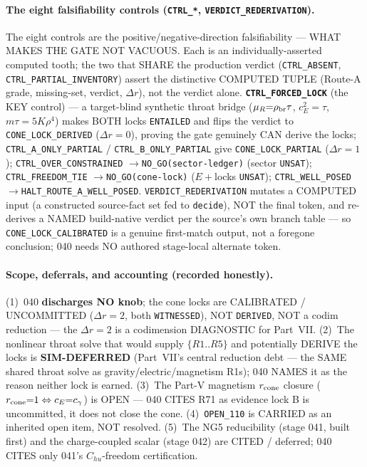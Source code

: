 \paragraph{The eight falsifiability controls (\texttt{CTRL\_*}, \texttt{VERDICT\_REDERIVATION}).}
The eight controls are the positive/negative-direction falsifiability --- WHAT
MAKES THE GATE NOT VACUOUS. Each is an individually-asserted computed tooth; the
two that SHARE the production verdict (\texttt{CTRL\_ABSENT},
\texttt{CTRL\_PARTIAL\_INVENTORY}) assert the distinctive COMPUTED TUPLE
(Route-A grade, missing-set, verdict, \(\Delta r\)), not the verdict alone.
\textbf{\texttt{CTRL\_FORCED\_LOCK}} (the KEY control) --- a target-blind synthetic
throat bridge (\(\mu_R{=}\rho_{\rm br}\tau\), \(c_E^2{=}\tau\),
\(m\tau{=}5K\rho^4\)) makes BOTH locks \texttt{ENTAILED} and flips the verdict to
\texttt{CONE\_LOCK\_DERIVED} (\(\Delta r{=}0\)), proving the gate genuinely CAN
derive the locks; \texttt{CTRL\_A\_ONLY\_PARTIAL} /
\texttt{CTRL\_B\_ONLY\_PARTIAL} give \texttt{CONE\_LOCK\_PARTIAL} (\(\Delta r{=}1\));
\texttt{CTRL\_OVER\_CONSTRAINED} \(\to\)\texttt{NO\_GO(sector-ledger)} (sector
\texttt{UNSAT}); \texttt{CTRL\_FREEDOM\_TIE} \(\to\)\texttt{NO\_GO(cone-lock)}
(\(E{+}\)locks \texttt{UNSAT}); \texttt{CTRL\_WELL\_POSED}
\(\to\)\texttt{HALT\_ROUTE\_A\_WELL\_POSED}. \texttt{VERDICT\_REDERIVATION} mutates
a COMPUTED input (a constructed source-fact set fed to \texttt{decide}), NOT the
final token, and re-derives a NAMED build-native verdict per the source's own
branch table --- so \texttt{CONE\_LOCK\_CALIBRATED} is a genuine first-match
output, not a foregone conclusion; 040 needs NO authored stage-local alternate
token.

\paragraph{Scope, deferrals, and accounting (recorded honestly).}
(1)~040 \textbf{discharges NO knob}; the cone locks are CALIBRATED / UNCOMMITTED
(\(\Delta r{=}2\), both \texttt{WITNESSED}), NOT \texttt{DERIVED}, NOT a codim
reduction --- the \(\Delta r{=}2\) is a codimension DIAGNOSTIC for Part~VII.
(2)~The nonlinear throat solve that would supply \(\{R1..R5\}\) and potentially
DERIVE the locks is \textbf{SIM-DEFERRED} (Part~VII's central reduction debt --- the
SAME shared throat solve as gravity/electric/magnetism R1s); 040 NAMES it as the
reason neither lock is earned. (3)~The Part-V magnetism \(r_{\rm cone}\) closure
(\(r_{\rm cone}{=}1\Leftrightarrow c_E{=}c_\gamma\)) is OPEN --- 040 CITES R71 as
evidence lock B is uncommitted, it does not close the cone. (4)~\texttt{OPEN\_110}
is CARRIED as an inherited open item, NOT resolved. (5)~The NG5 reducibility (stage
041, built first) and the charge-coupled scalar (stage 042) are CITED / deferred;
040 CITES only 041's \(C_{hu}\)-freedom certification.

